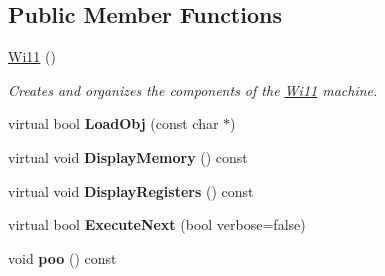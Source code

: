 \subsection*{Public Member Functions}
\begin{DoxyCompactItemize}
\item 
\hyperlink{classWi11_ad8e6d1a1e39832bdc650f2ca3cfa2d3e}{Wi11} ()
\begin{DoxyCompactList}\small\item\em Creates and organizes the components of the \hyperlink{classWi11}{Wi11} machine. \item\end{DoxyCompactList}\item 
\hypertarget{classWi11_a50af76350b3e72c75d42035582aeb321}{
virtual bool {\bfseries LoadObj} (const char $\ast$)}
\label{classWi11_a50af76350b3e72c75d42035582aeb321}

\item 
\hypertarget{classWi11_a0f532cefdebd3c33ddc93e8bce4dc06b}{
virtual void {\bfseries DisplayMemory} () const }
\label{classWi11_a0f532cefdebd3c33ddc93e8bce4dc06b}

\item 
\hypertarget{classWi11_a201359b2506539dda72075b908076492}{
virtual void {\bfseries DisplayRegisters} () const }
\label{classWi11_a201359b2506539dda72075b908076492}

\item 
\hypertarget{classWi11_ace44826e4f92aabd233b68bdd9437c1b}{
virtual bool {\bfseries ExecuteNext} (bool verbose=false)}
\label{classWi11_ace44826e4f92aabd233b68bdd9437c1b}

\item 
\hypertarget{classWi11_a99a02dc05270d20ad6ad39823ee976b6}{
void {\bfseries poo} () const }
\label{classWi11_a99a02dc05270d20ad6ad39823ee976b6}

\end{DoxyCompactItemize}
